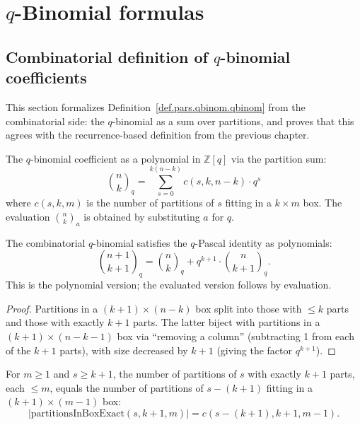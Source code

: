 \section{$q$-Binomial formulas}

\subsection{Combinatorial definition of $q$-binomial coefficients}

This section formalizes Definition~\ref{def.pars.qbinom.qbinom} from the combinatorial
side: the $q$-binomial as a sum over partitions, and proves that this agrees with
the recurrence-based definition from the previous chapter.

\begin{definition}
\label{def.qbinomial-formulas.qbinom-poly}
\leanhelper
\leanok
The $q$-binomial coefficient as a polynomial in $\mathbb{Z}[q]$ via the partition sum:
\[
\binom{n}{k}_q = \sum_{s=0}^{k(n-k)} c(s, k, n-k) \cdot q^s
\]
where $c(s,k,m)$ is the number of partitions of $s$ fitting in a $k \times m$ box.
The evaluation $\binom{n}{k}_a$ is obtained by substituting $a$ for $q$.
\end{definition}

\begin{lemma}
\label{lem.qbinomial-formulas.pascal-poly}
\leanhelper
\leanok
The combinatorial $q$-binomial satisfies the $q$-Pascal identity as polynomials:
\[
\binom{n+1}{k+1}_q = \binom{n}{k}_q + q^{k+1} \cdot \binom{n}{k+1}_q.
\]
This is the polynomial version; the evaluated version follows by evaluation.
\end{lemma}

\begin{proof}
\leanok
Partitions in a $(k{+}1) \times (n{-}k)$ box split into those with $\le k$ parts
and those with exactly $k{+}1$ parts. The latter biject with partitions in a
$(k{+}1) \times (n{-}k{-}1)$ box via ``removing a column'' (subtracting 1 from
each of the $k{+}1$ parts), with size decreased by $k{+}1$ (giving the factor $q^{k+1}$).
\end{proof}

\begin{lemma}
\label{lem.qbinomial-formulas.exact-parts-bij}
\leanhelper
\leanok
For $m \ge 1$ and $s \ge k+1$, the number of partitions of $s$ with exactly $k+1$ parts,
each $\le m$, equals the number of partitions of $s - (k+1)$ fitting in a
$(k+1) \times (m-1)$ box:
\[
|\mathrm{partitionsInBoxExact}(s, k{+}1, m)| = c(s{-}(k{+}1), k{+}1, m{-}1).
\]
\end{lemma}

